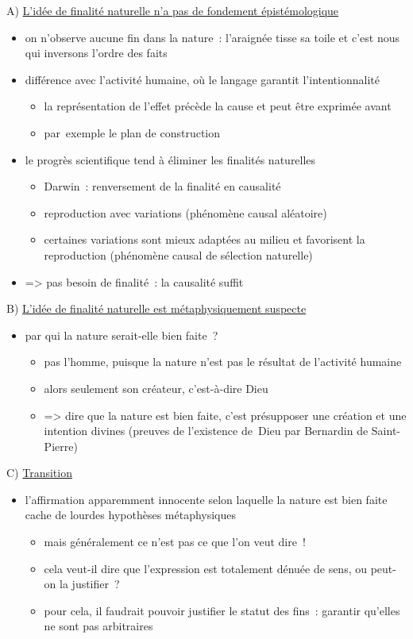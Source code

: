 \documentclass[a4paper,12pt]{article}
\begin{document}
A) \uline{L'idée de finalité naturelle n'a pas de fondement épistémologique}
\begin{itemize}
\item on n'observe aucune fin dans la nature : l'araignée tisse sa toile et
c'est nous qui inversons l'ordre des faits
\item différence avec l'activité humaine, où le langage garantit
l'intentionnalité
\begin{itemize}
\item la représentation de l'effet précède la cause et peut être exprimée
avant
\item par exemple le plan de construction
\end{itemize}
\item le progrès scientifique tend à éliminer les finalités naturelles 
\begin{itemize}
\item Darwin : renversement de la finalité en causalité
\item reproduction avec variations (phénomène causal aléatoire)
\item certaines variations sont mieux adaptées au milieu et favorisent la
reproduction (phénomène causal de sélection naturelle)
\end{itemize}
\item => pas besoin de finalité : la causalité suffit
\end{itemize}

\medskip

B) \uline{L'idée de finalité naturelle est métaphysiquement suspecte} 
\begin{itemize}
\item par qui la nature serait-elle bien faite ?
\begin{itemize}
\item pas l'homme, puisque la nature n'est pas le résultat de l'activité
humaine
\item alors seulement son créateur, c'est-à-dire Dieu
\item => dire que la nature est bien faite, c'est présupposer une création
et une intention divines (preuves de l'existence de Dieu par
Bernardin de Saint-Pierre)
\end{itemize}
\end{itemize}

\medskip

C) \uline{Transition}
\begin{itemize}
\item l'affirmation apparemment innocente selon laquelle la nature est bien
faite cache de lourdes hypothèses métaphysiques
\begin{itemize}
\item mais généralement ce n'est pas ce que l'on veut dire !
\item cela veut-il dire que l'expression est totalement dénuée de sens, ou
peut-on la justifier ?
\item pour cela, il faudrait pouvoir justifier le statut des fins :
garantir qu'elles ne sont pas arbitraires
\end{itemize}
\end{itemize}
\end{document}
